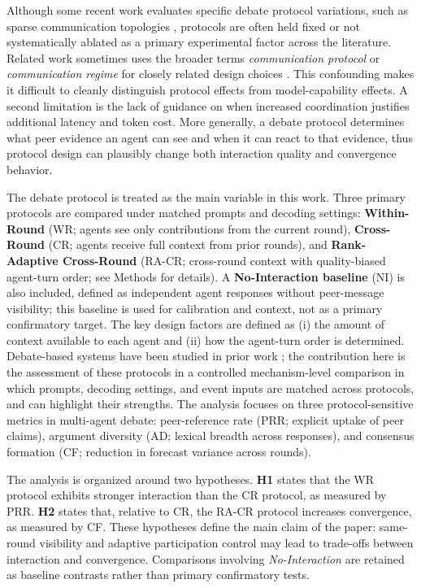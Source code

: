 \documentclass[11pt]{article}
\begin{document}
Although some recent work evaluates specific debate protocol variations, such as sparse communication topologies \citep{li-etal-2024-improving-multi}, protocols are often held fixed or not systematically ablated as a primary experimental factor across the literature. Related work sometimes uses the broader terms \emph{communication protocol} or \emph{communication regime} for closely related design choices \citep{pham2023cipher}. This confounding makes it difficult to cleanly distinguish protocol effects from model-capability effects. A second limitation is the lack of guidance on when increased coordination justifies additional latency and token cost. More generally, a debate protocol determines what peer evidence an agent can see and when it can react to that evidence, thus protocol design can plausibly change both interaction quality and convergence behavior.

The debate protocol is treated as the main variable in this work. Three primary protocols are compared under matched prompts and decoding settings: \textbf{Within-Round} (WR; agents see only contributions from the current round), \textbf{Cross-Round} (CR; agents receive full context from prior rounds), and \textbf{Rank-Adaptive Cross-Round} (RA-CR; cross-round context with quality-biased agent-turn order; see Methods for details). A \textbf{No-Interaction baseline} (NI) is also included, defined as independent agent responses without peer-message visibility; this baseline is used for calibration and context, not as a primary confirmatory target. The key design factors are defined as (i) the amount of context available to each agent and (ii) how the agent-turn order is determined. Debate-based systems have been studied in prior work \citep{du2024debate,liang2024divergent,wu2024autogen,li2023camel,swedebate2025,chan2023chateval}; the contribution here is the assessment of these protocols in a controlled mechanism-level comparison in which prompts, decoding settings, and event inputs are matched across protocols, and can highlight their strengths. The analysis focuses on three protocol-sensitive metrics in multi-agent debate: peer-reference rate (PRR; explicit uptake of peer claims), argument diversity (AD; lexical breadth across responses), and consensus formation (CF; reduction in forecast variance across rounds).

The analysis is organized around two hypotheses. \textbf{H1} states that the WR protocol exhibits stronger interaction than the CR protocol, as measured by PRR. \textbf{H2} states that, relative to CR, the RA-CR protocol increases convergence, as measured by CF. These hypotheses define the main claim of the paper: same-round visibility and adaptive participation control may lead to trade-offs between interaction and convergence. Comparisons involving \emph{No-Interaction} are retained as baseline contrasts rather than primary confirmatory tests.
\end{document}

